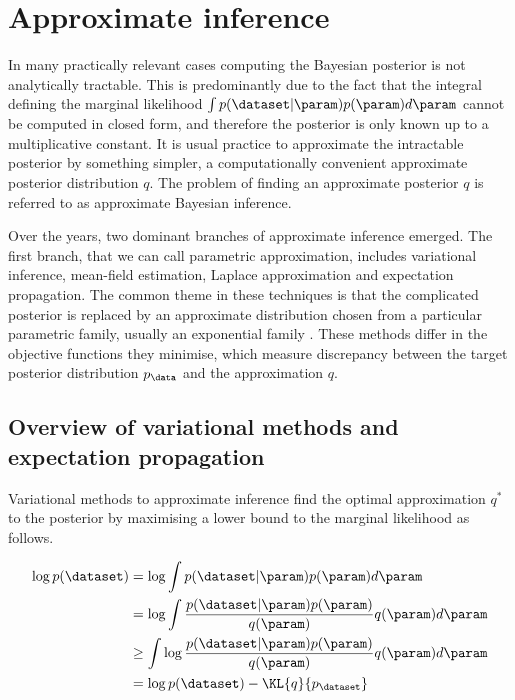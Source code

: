 \section{Approximate inference\label{sec:losscalibrated}}

In many practically relevant cases computing the Bayesian posterior is not analytically tractable. This is predominantly due to the fact that the integral defining the marginal likelihood $\int p(\dataset\vert\param)p(\param)d\param$ cannot be computed in closed form, and therefore the posterior is only known up to a multiplicative constant. It is usual practice to approximate the intractable posterior by something simpler, a computationally convenient approximate posterior distribution $q$. The problem of finding an approximate posterior $q$ is referred to as approximate Bayesian inference.

Over the years, two dominant branches of approximate inference emerged. The first branch, that we can call parametric approximation, includes variational inference, mean-field estimation, Laplace approximation and expectation propagation. The common theme in these techniques is that the complicated posterior is replaced by an approximate distribution chosen from a particular parametric family, usually an exponential family \citep{Wainwright2008}. These methods differ in the objective functions they minimise, which measure discrepancy between the target posterior distribution $p_\data$ and the approximation $q$.

\subsection{Overview of variational methods and expectation propagation}

Variational methods to approximate inference find the optimal approximation $q^{*}$ to the posterior by maximising a lower bound to the marginal likelihood as follows.

\begin{align}
	\log p(\dataset) &= \log \int p(\dataset\vert\param)p(\param) d\param\\
		&=\log \int \frac{p(\dataset\vert\param)p(\param)}{q(\param)}q(\param) d\param\\
		&\geq \int \log \frac{p(\dataset\vert\param)p(\param)}{q(\param)} q(\param) d\param\\
		&= \log p(\dataset) - \KL{q}{p_{\dataset}}      \label{eqn:variational_lower_bound}
\end{align}

